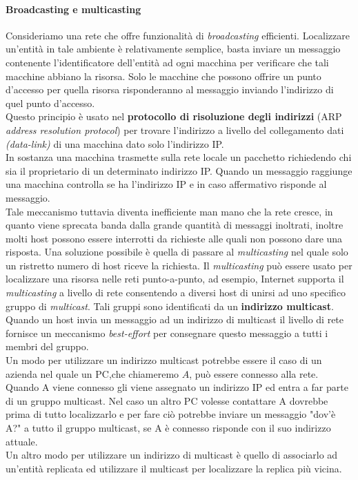 \paragraph{Broadcasting e multicasting}
Consideriamo una rete che offre funzionalità di \emph{broadcasting} efficienti. Localizzare un'entità in tale ambiente è relativamente semplice, basta inviare un messaggio contenente l'identificatore dell'entità ad ogni macchina per verificare che tali macchine abbiano la risorsa. Solo le macchine che possono offrire un punto d'accesso per quella risorsa risponderanno al messaggio inviando l'indirizzo di quel punto d'accesso.\\
Questo principio è usato nel \textbf{protocollo di risoluzione degli indirizzi} (ARP \emph{address resolution protocol}) per trovare l'indirizzo a livello del collegamento dati \emph{(data-link)} di una macchina dato solo l'indirizzo IP.\\
In sostanza una macchina trasmette sulla rete locale un pacchetto richiedendo chi sia il proprietario di un determinato indirizzo IP. Quando un messaggio raggiunge una macchina controlla se ha l'indirizzo IP e in caso affermativo risponde al messaggio.\\
Tale meccanismo tuttavia diventa inefficiente man mano che la rete cresce, in quanto viene sprecata banda dalla grande quantità di messaggi inoltrati, inoltre molti host possono essere interrotti da richieste alle quali non possono dare una risposta. Una soluzione possibile è quella di passare al \emph{multicasting} nel quale solo un ristretto numero di host riceve la richiesta. Il \emph{multicasting} può essere usato per localizzare una risorsa nelle reti punto-a-punto, ad esempio, Internet supporta il \emph{multicasting} a livello di rete consentendo a diversi host di unirsi ad uno specifico gruppo di \emph{multicast}. Tali gruppi sono identificati da un \textbf{indirizzo multicast}. Quando un host invia un messaggio ad un indirizzo di multicast il livello di rete fornisce un meccanismo \emph{best-effort} per consegnare questo messaggio a tutti i membri del gruppo.\\
Un modo per utilizzare un indirizzo multicast potrebbe essere il caso di un azienda nel quale un PC,che chiameremo $A$, può essere connesso alla rete. Quando A viene connesso gli viene assegnato un indirizzo IP ed entra a far parte di un gruppo multicast. Nel caso un altro PC volesse contattare A dovrebbe prima di tutto localizzarlo e per fare ciò potrebbe inviare un messaggio "dov'è A?" a tutto il gruppo multicast, se A è connesso risponde con il suo indirizzo attuale.\\
Un altro modo per utilizzare un indirizzo di multicast è quello di associarlo ad un'entità replicata ed utilizzare il multicast per localizzare la replica più vicina.
